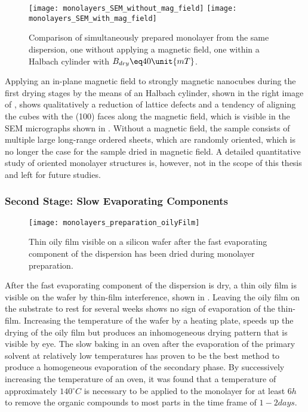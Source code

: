 \documentclass[\main/dresen_thesis.tex]{subfiles}
\begin{document}
    \begin{figure}[tb]
      \centering
      \texttt{[image: monolayers\_SEM\_without\_mag\_field]}
      \texttt{[image: monolayers\_SEM\_with\_mag\_field]}
      \caption{\label{fig:monolayers:preparation:dryingConditions:magneticField}Comparison of simultaneously prepared monolayer from the same dispersion, one without applying a magnetic field, one within a Halbach cylinder with $B_{dry} \eq 40 \unit{mT}$.}
    \end{figure}
    Applying an in-plane magnetic field to strongly magnetic nanocubes during the first drying stages by the means of an Halbach cylinder, shown in the right image of , shows qualitatively a reduction of lattice defects and a tendency of aligning the cubes with the (100) faces along the magnetic field, which is visible in the SEM micrographs shown in .
    Without a magnetic field, the sample consists of multiple large long-range ordered sheets, which are randomly oriented, which is no longer the case for the sample dried in magnetic field.
    A detailed quantitative study of oriented monolayer structures is, however, not in the scope of this thesis and left for future studies.

  \subsubsection{Second Stage: Slow Evaporating Components}
    \begin{figure}[tb]
      \centering
      \texttt{[image: monolayers\_preparation\_oilyFilm]}
      \caption{\label{fig:monolayers:preparation:dryingConditions:oilyFilm}Thin oily film visible on a silicon wafer after the fast evaporating component of the dispersion has been dried during monolayer preparation.}
    \end{figure}

    After the fast evaporating component of the dispersion is dry, a thin oily film is visible on the wafer by thin-film interference, shown in .
    Leaving the oily film on the substrate to rest for several weeks shows no sign of evaporation of the thin-film.
    Increasing the temperature of the wafer by a heating plate, speeds up the drying of the oily film but produces an inhomogeneous drying pattern that is visible by eye.
    The slow baking in an oven after the evaporation of the primary solvent at relatively low temperatures has proven to be the best method to produce a homogeneous evaporation of the secondary phase.
    By successively increasing the temperature of an oven, it was found that a temperature of approximately $140 \unit{^\circ C}$ is necessary to be applied to the monolayer for at least $6 \unit{h}$ to remove the organic compounds to most parts in the time frame of $1 - 2 \unit{days}$.
\end{document}
